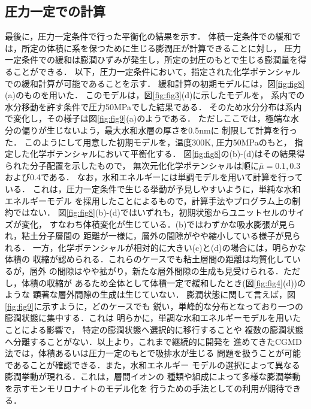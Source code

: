 \subsection{圧力一定での計算}
最後に，圧力一定条件で行った平衡化の結果を示す．
体積一定条件での緩和では，所定の体積に系を保つために生じる膨潤圧が計算できることに対し，
圧力一定条件での緩和は膨潤ひずみが発生し，所定の封圧のもとで生じる膨潤量を得ることができる．
以下，圧力一定条件において，指定された化学ポテンシャルでの緩和計算が可能であることを示す．
緩和計算の初期モデルには，図\ref{fig:fig8}(a)のものを用いた．
このモデルは，図\ref{fig:fig3}(d)に示したモデルを，
系内での水分移動を許す条件で圧力50MPaでした結果である．
そのため水分分布は系内で変化し，その様子は図\ref{fig:fig9}(a)のようである．
ただしここでは，極端な水分の偏りが生じないよう，最大水和水層の厚さを0.5nmに
制限して計算を行った．
このようにして用意した初期モデルを，温度300K, 圧力50MPaのもと，
指定した化学ポテンシャルにおいて平衡化する．
図\ref{fig:fig8}の(b)-(d)はその結果得られた分子配置を示したもので，
無次元化化学ポテンシャルは順に$\bar{\mu}=0.1,0.3$および0.4である．
なお，水和エネルギーには単調モデルを用いて計算を行っている．
これは，圧力一定条件で生じる挙動が予見しやすいように，単純な水和エネルギーモデル
を採用したことによるもので，計算手法やプログラム上の制約ではない．
図\ref{fig:fig8}(b)-(d)ではいずれも，初期状態からユニットセルのサイズが変化，
すなわち体積変化が生じている．(b)ではわずかな吸水膨張が見られ，粘土分子層間の
距離が一様に，層外の間隙がやや縮小している様子が見られる．
一方，化学ポテンシャルが相対的に大きい(c)と(d)の場合には，明らかな体積の
収縮が認められる．これらのケースでも粘土層間の距離は均質化しているが，層外
の間隙はやや拡がり，新たな層外間隙の生成も見受けられる．ただし，体積の収縮が
あるため全体として体積一定で緩和したとき(図\ref{fig:fig4}(d))のような
顕著な層外間隙の生成は生じていない．
膨潤状態に関して言えば，図\ref{fig:fig9}に示すように，どのケースでも
鋭い，単峰的な分布となっており一つの膨潤状態に集中する．これは
明らかに，単調な水和エネルギーモデルを用いたことによる影響で，
特定の膨潤状態へ選択的に移行することや
複数の膨潤状態へ分離することがない．以上より，これまで継続的に開発を
進めてきたCGMD法では，体積あるいは圧力一定のもとで吸排水が生じる
問題を扱うことが可能であることが確認できる．また，水和エネルギー
モデルの選択によって異なる膨潤挙動が現れる．これは，層間イオンの
種類や組成によって多様な膨潤挙動を示すモンモリロナイトのモデル化を
行うための手法としての利用が期待できる．
